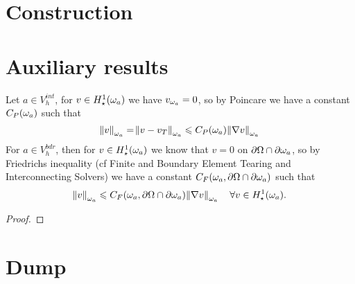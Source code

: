 \documentclass[thesis.tex]{subfiles}
\begin{document}
\section{Construction}




\section{Auxiliary results}
\label{sec:aux}
Let $a \in V_h^{int}$, for $v \in H_\star^1(\omega_a)$ we have $v_{\omega_a} = 0$, so by Poincare we have a constant $C_P(\omega_a)$ such that 
\[
  \norm{v}_{\omega_a} = \norm{v - v_T}_{\omega_a} \leqslant C_P(\omega_a) \norm{\nabla v}_{\omega_a}
\]
For $a \in V_h^{bdr}$, then for $v \in H_\star^1(\omega_a)$ we know that $v = 0$ on $\partial \Omega \cap \partial \omega_a$, so by Friedrichs inequality
(cf Finite and Boundary Element Tearing and Interconnecting Solvers) we
have a constant $C_F(\omega_a, \partial \Omega \cap \partial \omega_a)$ such that
\[
  \norm{v}_{\omega_a} \leqslant C_F(\omega_a, \partial \Omega \cap \partial \omega_a) \norm{\nabla v}_{\omega_a} \quad \forall v \in H_\star^1(\omega_a).
\]

\begin{proof}
\end{proof}


\section{Dump}
\end{document}
